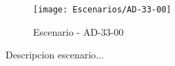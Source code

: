 \begin{figure}[H]
\centering
\texttt{[image: Escenarios/AD-33-00]}
\caption{Escenario - AD-33-00}
\label{fig:AD-33-00}
\end{figure}

Descripcion escenario...
\clearpage
